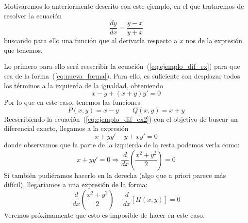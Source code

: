\begin{ejemplo}
    Motivaremos lo anteriormente descrito con este ejemplo, en el que trataremos de resolver la ecuación
    \begin{equation}\label{eq:ejemplo_dif_ex}
        \dfrac{dy}{dx} = \dfrac{y-x}{y+x}
    \end{equation}
    buscando para ello una función que al derivarla respecto a $x$ nos de la expresión que tenemos.

    Lo primero para ello será reescribir la ecuación~(\ref{eq:ejemplo_dif_ex}) para que sea de la forma~(\ref{eq:nueva_forma}). Para ello, es suficiente con desplazar todos los términos a la izquierda de la igualdad, obteniendo
    \begin{equation}\label{eq:ejemplo_dif_ex2}
        x-y+(x+y)y' = 0
    \end{equation}
    Por lo que en este caso, tenemos las funciones
    \begin{equation*}
        P(x,y) = x-y \qquad Q(x,y) = x+y
    \end{equation*}
    Reescribiendo la ecuación~(\ref{eq:ejemplo_dif_ex2}) con el objetivo de buscar un diferencial exacto, llegamos a la expresión
    \begin{equation*}
        x+yy' - y+xy' = 0
    \end{equation*}
    donde observamos que la parte de la izquierda de la resta podemos verla como:
    \begin{equation*}
        x+yy' = 0 \Longrightarrow \dfrac{d}{dx}\left(\dfrac{x^2+y^2}{2}\right) = 0
    \end{equation*}
    Si también pudiéramos hacerlo en la derecha (algo que a priori parece más difícil), llegaríamos a una expresión de la forma:
    \begin{equation*}
        \dfrac{d}{dx}\left(\dfrac{x^2+y^2}{2}\right) - \dfrac{d}{dx}[H(x,y)] = 0
    \end{equation*}
    Veremos próximamente que esto es imposible de hacer en este caso.


\end{ejemplo}
